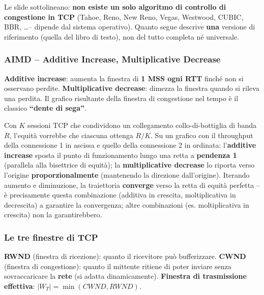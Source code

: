 \documentclass[12pt, a4paper]{article}
\begin{document}
\begin{tcolorbox}[colback=red!5, colframe=red!60!black, title=\textbf{Attenzione}]
Le slide sottolineano: \textbf{non esiste un solo algoritmo di controllo di congestione in TCP} (Tahoe, Reno, New Reno, Vegas, Westwood, CUBIC, BBR, \dots -- dipende dal sistema operativo). Quanto segue descrive \textbf{una} versione di riferimento (quella del libro di testo), non del tutto completa né universale.
\end{tcolorbox}

\subsubsection{AIMD -- Additive Increase, Multiplicative Decrease}

\textbf{Additive increase}: aumenta la finestra di \textbf{1 MSS ogni RTT} finché non si osservano perdite. \textbf{Multiplicative decrease}: dimezza la finestra quando si rileva una perdita. Il grafico risultante della finestra di congestione nel tempo è il classico \textbf{``dente di sega''}.

\begin{tcolorbox}[colback=cyan!5, colframe=blue!40!black, title=\textbf{Perché AIMD e non altre combinazioni?}]
Con $K$ sessioni TCP che condividono un collegamento collo-di-bottiglia di banda $R$, l'equità vorrebbe che ciascuna ottenga $R/K$. Su un grafico con il throughput della connessione 1 in ascissa e quello della connessione 2 in ordinata: l'\textbf{additive increase} sposta il punto di funzionamento lungo una retta a \textbf{pendenza 1} (parallela alla bisettrice di equità); la \textbf{multiplicative decrease} lo riporta verso l'origine \textbf{proporzionalmente} (mantenendo la direzione dall'origine). Iterando aumento e diminuzione, la traiettoria \textbf{converge} verso la retta di equità perfetta -- è precisamente questa combinazione (additiva in crescita, moltiplicativa in decrescita) a garantire la convergenza; altre combinazioni (es. moltiplicativa in crescita) non la garantirebbero.
\end{tcolorbox}

\subsubsection{Le tre finestre di TCP}

\textbf{RWND} (finestra di ricezione): quanto il ricevitore può bufferizzare. \textbf{CWND} (finestra di congestione): quanto il mittente ritiene di poter inviare senza sovraccaricare la \textbf{rete} (si adatta dinamicamente). \textbf{Finestra di trasmissione effettiva}: $|W_T| = \min(CWND, RWND)$.
\end{document}
